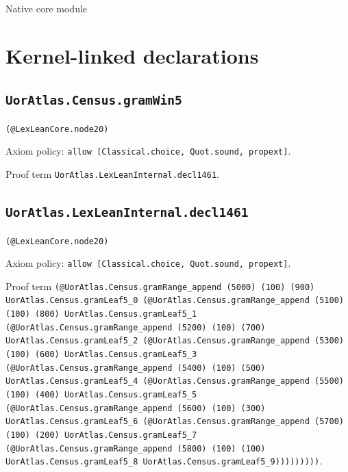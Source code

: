 \documentclass[11pt]{article}
\begin{document}
\begin{center}{\LARGE Native core module}\end{center}
\section*{Kernel-linked declarations}
\subsection*{\texttt{UorAtlas.Census.gramWin5}}
\noindent\texttt{(@LexLeanCore.node20)}\par
\noindent Axiom policy: \texttt{allow [Classical.choice, Quot.sound, propext]}.\par
\noindent Proof term \texttt{UorAtlas.LexLeanInternal.decl1461}.\par
\subsection*{\texttt{UorAtlas.LexLeanInternal.decl1461}}
\noindent\texttt{(@LexLeanCore.node20)}\par
\noindent Axiom policy: \texttt{allow [Classical.choice, Quot.sound, propext]}.\par
\noindent Proof term \texttt{(@UorAtlas.Census.gramRange\_append (5000) (100) (900) UorAtlas.Census.gramLeaf5\_0 (@UorAtlas.Census.gramRange\_append (5100) (100) (800) UorAtlas.Census.gramLeaf5\_1 (@UorAtlas.Census.gramRange\_append (5200) (100) (700) UorAtlas.Census.gramLeaf5\_2 (@UorAtlas.Census.gramRange\_append (5300) (100) (600) UorAtlas.Census.gramLeaf5\_3 (@UorAtlas.Census.gramRange\_append (5400) (100) (500) UorAtlas.Census.gramLeaf5\_4 (@UorAtlas.Census.gramRange\_append (5500) (100) (400) UorAtlas.Census.gramLeaf5\_5 (@UorAtlas.Census.gramRange\_append (5600) (100) (300) UorAtlas.Census.gramLeaf5\_6 (@UorAtlas.Census.gramRange\_append (5700) (100) (200) UorAtlas.Census.gramLeaf5\_7 (@UorAtlas.Census.gramRange\_append (5800) (100) (100) UorAtlas.Census.gramLeaf5\_8 UorAtlas.Census.gramLeaf5\_9)))))))))}.\par
\end{document}
